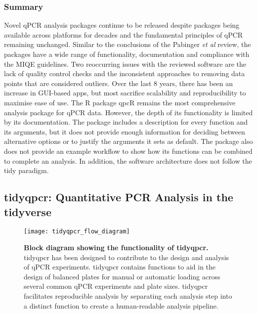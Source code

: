 \documentclass[../main.tex]{subfiles}
\begin{document}
\subsubsection{Summary}

Novel qPCR analysis packages continue to be released despite packages being available across platforms for decades and the fundamental principles of qPCR remaining unchanged. 
Similar to the conclusions of the Pabinger \textit{et al} review, the packages have a wide range of functionality, documentation and compliance with the MIQE guidelines. 
Two reoccurring issues with the reviewed software are the lack of quality control checks and the inconsistent approaches to removing data points that are considered outliers.
Over the last 8 years, there has been an increase in GUI-based apps, but most sacrifice scalability and reproducibility to maximise ease of use. 
The R package qpcR remains the most comprehensive analysis package for qPCR data. 
However, the depth of its functionality is limited by its documentation.
The package includes a description for every function and its arguments, but it does not provide enough information for deciding between alternative options or to justify the arguments it sets as default.
The package also does not provide an example workflow to show how its functions can be combined to complete an analysis.
In addition, the software architecture does not follow the tidy paradigm.

\subsection{tidyqpcr: Quantitative PCR Analysis in the tidyverse}

\begin{figure}

{\centering \texttt{[image: tidyqpcr\_flow\_diagram]} 

}

\caption[Block diagram showing the functionality of tidyqpcr.]{\textbf{Block diagram showing the functionality of tidyqpcr.} tidyqpcr has been designed to contribute to the design and analysis of qPCR experiments. 
tidyqpcr contains functions to aid in the design of balanced plates for manual or automatic loading across several common qPCR experiments and plate sizes.
tidyqpcr facilitates reproducible analysis by separating each analysis step into a distinct function to create a human-readable analysis pipeline.}\label{fig:tidyqpcr-block-diagram}
\end{figure}
\end{document}

